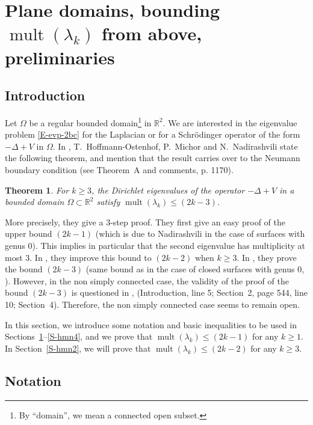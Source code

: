 \documentclass[12pt,a4paper]{amsart}
\theoremstyle{plain} %
\newtheorem{theorem}{Theorem}[section]
\theoremstyle{definition}
\numberwithin{equation}{section}
\numberwithin{figure}{section}
\numberwithin{table}{section}
\newcommand{\R}{\mathbb{R}}
\DeclareMathOperator{\mult}{mult}
\begin{document}
\section{Plane domains, bounding $\mult(\lambda_k)$ from above, preliminaries}\label{S-hmn}


\subsection{Introduction}\label{SS-hmn-i}

Let $\Omega$ be a regular bounded domain\footnote{By ``domain'', we mean a connected open subset.} in $\R^2$. We are interested in the eigenvalue problem \eqref{E-evp-2bc} for the Laplacian or for a Schr\"{o}dinger operator of the form $-\Delta + V$ in $\Omega$.  In \cite{HoMN1999}, T.~Hoffmann-Ostenhof, P.~Michor and N.~Nadirashvili state the following theorem, and mention that the result carries over to the Neumann boundary condition (see Theorem~A and comments, p. 1170).

\begin{theorem}\label{T-hmn}
For $k \ge 3$, the Dirichlet eigenvalues of  the operator $-\Delta + V$ in a bounded domain $\Omega \subset \R^2$ satisfy $\mult(\lambda_k) \le (2k-3)$.
\end{theorem}%

More precisely, they give a $3$-step proof. They first give an easy proof of the upper bound $(2k-1)$ (which is due to Nadirashvili \cite{Nadi1987} in the case of surfaces with genus $0$). This implies in particular that the second eigenvalue has multiplicity at most $3$.  In \cite[Section~2]{HoMN1999}, they improve this bound to $(2k-2)$ when $k\geq 3$. In \cite[Section~3]{HoMN1999}, they prove the bound $(2k-3)$ (same bound as in the case of closed surfaces with genus $0$, \cite{HoHN1999}).  However, in the non simply connected case, the validity of the proof of the bound $(2k-3)$  is questioned  in \cite{Berd2018}, (Introduction, line 5; Section~2, page 544, line 10; Section~4). Therefore,  the non simply connected case seems to remain open. \smallskip

In this section, we introduce some notation and  basic inequalities to be used in Sections~\ref{S-hmn}--\ref{S-hmn4}, and we prove that $\mult(\lambda_k) \le (2k-1)$  for any $k\ge 1$. In Section~\ref{S-hmn2}, we  will prove  that  $\mult(\lambda_k) \le (2k-2)$  for any $k\ge 3$.


\subsection{Notation}\label{SS-hmn-0N}
\end{document}

